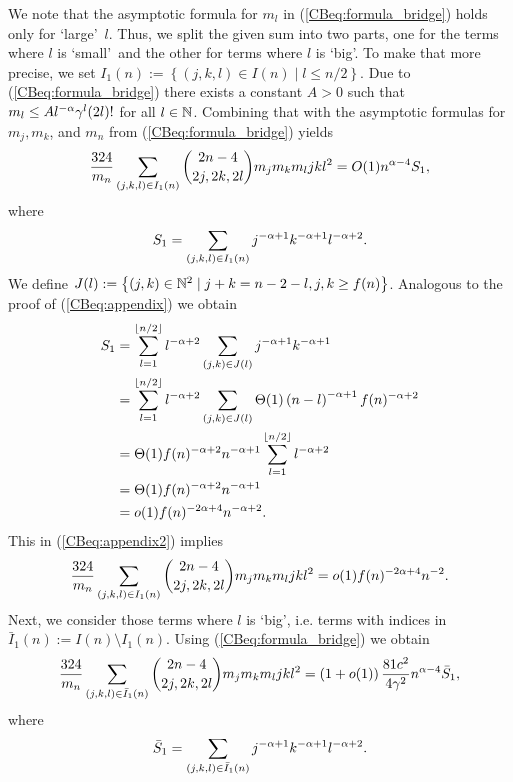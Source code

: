 We note that the asymptotic formula for $m_l$ in (\ref{CBeq:formula_bridge}) holds only for \lq large\rq\ $l$. Thus, we split the given sum into two parts, one for the terms where $l$ is \lq small\rq\ and the other for terms where $l$ is \lq big\rq. To make that more precise, we set $I_1(n):=\left\{\left(j,k,l\right) \in I(n) \mid l\leq n/2\right\}$. Due to (\ref{CBeq:formula_bridge}) there exists a constant $A>0$ such that $m_l\leq Al^{-\alpha}\gamma^l (2l)!$ for all $l\in \mathbb{N}$. Combining that with the asymptotic formulas for $m_j, m_k$, and $m_n$ from (\ref{CBeq:formula_bridge}) yields
\begin{align}\label{CBeq:appendix2}
\frac{324}{m_n}\sum_{(j,k,l)\in I_1(n)}\binom{2n-4}{2j,2k,2l}m_jm_km_lj k l^2=O(1)n^{\alpha-4}S_1,
\end{align}
where
\begin{align*}
S_1=\sum_{(j,k,l)\in I_1(n)}j^{-\alpha+1}k^{-\alpha+1}l^{-\alpha+2}.
\end{align*}
We define
$J(l):=\left\{(j,k) \in \mathbb{N}^2 \mid j+k=n-2-l, j,k\geq f(n) \right\}$. Analogous to the proof of (\ref{CBeq:appendix}) we obtain
\begin{align*}
S_1&=\sum_{l=1}^{\lfloor n/2 \rfloor}l^{-\alpha+2}\sum_{(j,k)\in J(l)}j^{-\alpha+1}k^{-\alpha+1}
\\
&=\sum_{l=1}^{\lfloor n/2 \rfloor}l^{-\alpha+2} \sum_{(j,k)\in J(l)}\Theta(1)\left(n-l\right)^{-\alpha+1}f(n)^{-\alpha+2}
\\
&=\Theta(1)f(n)^{-\alpha+2}n^{-\alpha+1}\sum_{l=1}^{\lfloor n/2 \rfloor}l^{-\alpha+2}
\\
&=\Theta(1)f(n)^{-\alpha+2}n^{-\alpha+1}
\\
&=o(1)f(n)^{-2\alpha+4}n^{-\alpha+2}.
\end{align*}
This in (\ref{CBeq:appendix2}) implies 
\begin{align}\label{CBeq:appendix4}
\frac{324}{m_n}\sum_{(j,k,l)\in I_1(n)}\binom{2n-4}{2j,2k,2l}m_jm_km_lj k l^2=o(1)f(n)^{-2\alpha+4}n^{-2}.
\end{align}
Next, we consider those terms where $l$ is \lq big\rq, i.e. terms with indices in $\bar{I}_1(n):=I(n)\setminus I_1(n)$. Using (\ref{CBeq:formula_bridge}) we obtain 
\begin{align}\label{CBeq:appendix3}
\frac{324}{m_n}\sum_{(j,k,l)\in \bar{I}_1(n)}\binom{2n-4}{2j,2k,2l}m_jm_km_lj k l^2=\left(1+o(1)\right)\frac{81c^2}{4\gamma^2}n^{\alpha-4}\bar{S}_1,
\end{align}
where
\begin{align*}
\bar{S}_1=\sum_{(j,k,l)\in \bar{I}_1(n)}j^{-\alpha+1}k^{-\alpha+1}l^{-\alpha+2}.
\end{align*}
